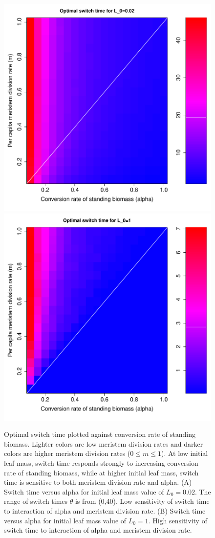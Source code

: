 \documentclass[12pt, oneside]{article}   	%
\begin{document}
\begin{figure}[!h]
       \includegraphics[width=.5\textwidth,page=2]{../../figures/1d-0.02-zoom.pdf}  
       \includegraphics[width=.5\textwidth,page=2]{../../figures/1d-1-zoom.pdf}  
    \caption{ Optimal switch time plotted against conversion rate of standing biomass. Lighter colors are low meristem division rates and darker colors are higher meristem division rates ($0\leq m \leq 1$). At low initial leaf mass, switch time responds strongly to increasing conversion rate of standing biomass, while at higher initial leaf mass, switch time is sensitive to both meristem division rate and alpha.  (A) Switch time versus alpha for initial leaf mass value of $L_0 = 0.02$. The range of switch times $\theta$ is from (0,40). Low sensitivity of switch time to interaction of alpha and meristem division rate. (B) Switch time versus alpha for initial leaf mass value of $L_0 = 1$. High sensitivity of switch time to interaction of alpha and meristem division rate.  }
 \label{fig:figure-x}
\end{figure}
\end{document}
